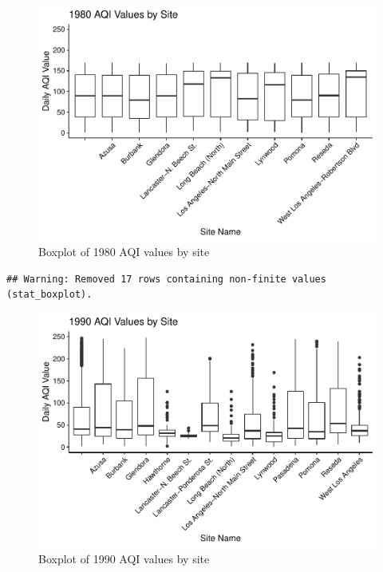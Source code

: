 \documentclass[12pt,]{article}
\begin{document}
\begin{figure}
\centering
\includegraphics{Roth_ENV872_Project_files/figure-latex/box plot 1-1.pdf}
\caption{Boxplot of 1980 AQI values by site}
\end{figure}

\begin{verbatim}
## Warning: Removed 17 rows containing non-finite values (stat_boxplot).
\end{verbatim}

\begin{figure}
\centering
\includegraphics{Roth_ENV872_Project_files/figure-latex/box plot 2-1.pdf}
\caption{Boxplot of 1990 AQI values by site}
\end{figure}
\end{document}
